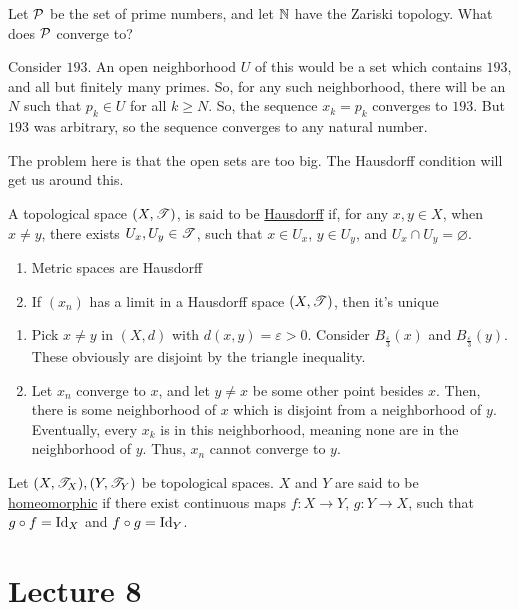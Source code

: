 \documentclass[x11names,reqno,14pt]{extarticle}
\begin{document}
\exm

Let $\mathcal{P}$ be the set of prime numbers, and let $\mathbb{N}$ have the Zariski topology. What does $\mathcal{P}$ converge to? 

Consider $193$. An open neighborhood $U$ of this would be a set which contains $193$, and all but finitely many primes. So, for any such neighborhood, there will be an $N$ such that $p_k \in U$ for all $k \geq N$. So, the sequence $x_k = p_k$ converges to $193$. But $193$ was arbitrary, so the sequence converges to any natural number. 

The problem here is that the open sets are too big. The Hausdorff condition will get us around this. 


A topological space $(X, \mathscr{T})$, is said to be \underline{Hausdorff} if, for any $x, y \in X$, when $x \neq y$, there exists $U_x, U_y \in \mathscr{T}$, such that $x \in U_x$, $y \in U_y$, and $U_x \cap U_y = \varnothing$. 

\lem


\begin{enumerate}[label=(\alph*)]
\item Metric spaces are Hausdorff
\item If $(x_n)$ has a limit in a Hausdorff space $(X, \mathscr{T})$, then it's unique 
\end{enumerate}

\proof
\begin{enumerate}[label=(\alph*)]
\item Pick $x \neq y$ in $(X, d)$ with $d(x, y) = \varepsilon>0$. Consider $B_{\frac{\varepsilon}{3}}(x)$ and $B_{\frac{\varepsilon}{3}}(y)$. These obviously are disjoint by the triangle inequality.
\item Let $x_n$ converge to $x$, and let $y \neq x$ be some other point besides $x$. Then, there is some neighborhood of $x$ which is disjoint from a neighborhood of $y$. Eventually, every $x_k$ is in this neighborhood, meaning none are in the neighborhood of $y$. Thus, $x_n$ cannot converge to $y$.  
\end{enumerate}


Let $(X, \mathscr{T}_X), (Y, \mathscr{T}_Y)$ be topological spaces. $X$ and $Y$ are said to be \underline{homeomorphic} if there exist continuous maps $f:X\to Y$, $g:Y\to X$, such that $g \circ f = \operatorname{\mathrm{Id}}_X$ and $f \circ g = \operatorname{\mathrm{Id}}_Y$.

\section*{Lecture 8}
\end{document}
